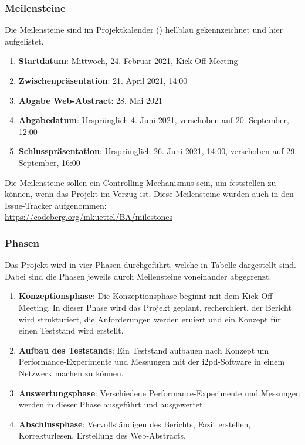 
\subsubsection{Meilensteine}
\label{sec:meilensteine}

Die Meilensteine sind im Projektkalender () hellblau gekennzeichnet und hier aufgelistet.

\begin{enumerate}[itemsep=0]
    \item \textbf{Startdatum}: Mittwoch, 24. Februar 2021, Kick-Off-Meeting
    \item \textbf{Zwischenpräsentation}: 21. April 2021, 14:00
    \item \textbf{Abgabe Web-Abstract}: 28. Mai 2021
    \item \textbf{Abgabedatum}: Ursprünglich 4. Juni 2021, verschoben auf 20. September, 12:00
    \item \textbf{Schlusspräsentation}: Ursprünglich 26. Juni 2021, 14:00, verschoben auf 29. September, 16:00
\end{enumerate}

Die Meilensteine sollen ein Controlling-Mechanismus sein, um feststellen zu können, wenn das Projekt im Verzug ist.
Diese Meilensteine wurden auch in den Issue-Tracker aufgenommen:\\
\url{https://codeberg.org/mkuettel/BA/milestones}

\subsubsection{Phasen}
\label{sec:phasen}

Das Projekt wird in vier Phasen durchgeführt, welche in Tabelle  dargestellt sind.
Dabei sind die Phasen jeweils durch Meilensteine voneinander abgegrenzt.

\begin{enumerate}[itemsep=0]
    \item \textbf{Konzeptionsphase}: Die Konzeptionsphase beginnt mit dem Kick-Off Meeting.
        In dieser Phase wird das Projekt geplant, recherchiert, der Bericht wird strukturiert, die Anforderungen werden eruiert und  ein Konzept für einen Teststand wird erstellt.
    \item \textbf{Aufbau des Teststands}: Ein Teststand aufbauen nach Konzept um Performance-Experimente und Messungen mit der i2pd-Software in einem Netzwerk machen zu können.
    \item \textbf{Auswertungsphase}: Verschiedene Performance-Experimente und Messungen werden in dieser Phase ausgeführt und ausgewertet.
    \item \textbf{Abschlussphase}: Vervollständigen des Berichts, Fazit erstellen, Korrekturlesen, Erstellung des Web-Abstracts.
\end{enumerate}

